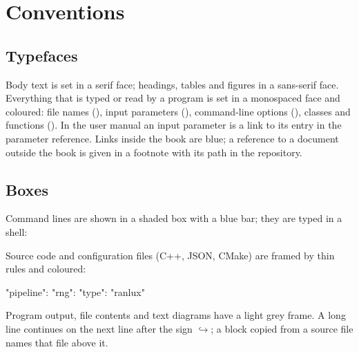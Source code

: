 \chapter*{Conventions}\label{conventions}

\section*{Typefaces}
Body text is set in a serif face; headings, tables and figures in a sans-serif face. Everything that is typed or read
by a program is set in a monospaced face and coloured: file names (), input parameters
(), command-line options (), classes and functions (). In the
user manual an input parameter is a link to its entry in the parameter reference. Links inside the book are blue;
a reference to a document outside the book is given in a footnote with its path in the repository.

\section*{Boxes}
Command lines are shown in a shaded box with a blue bar; they are typed in a shell:
Source code and configuration files (C++, JSON, CMake) are framed by thin rules and coloured:
\begin{simccode}[basicstyle=\ttfamily\footnotesize, style=simcjson]
{"pipeline": {"rng": {"type": "ranlux"}}}
\end{simccode}
Program output, file contents and text diagrams have a light grey frame. A long line continues on the next line
after the sign \textcolor{simcblue}{$\hookrightarrow$}; a block copied from a source file names that file above it.

